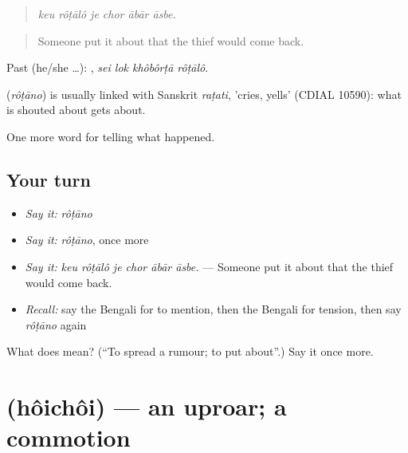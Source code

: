 \begin{quote}
     
\end{quote}

\begin{quote}
\emph{keu rôṭālô je chor ābār āsbe.}
\end{quote}

\begin{quote}
Someone put it about that the thief would come back.
\end{quote}

Past (he/she …):    , \emph{sei lok khôbôrṭā rôṭālô}.

\begin{cousinweb}
\textbf{} (\emph{rôṭāno}) is usually linked with Sanskrit \emph{raṭati}, 'cries, yells' (CDIAL 10590): what is shouted about gets about.
\end{cousinweb}

\begin{grammarlens}[title={What you've built}]
One more word for telling what happened.
\end{grammarlens}

\subsection*{Your turn}
\begin{itemize}
\raggedright
  \item \emph{Say it:} \emph{rôṭāno}
  \item \emph{Say it:} \emph{rôṭāno}, once more
  \item \emph{Say it:} \emph{keu rôṭālô je chor ābār āsbe.} — Someone put it about that the thief would come back.
  \item \emph{Recall:} say the Bengali for to mention, then the Bengali for tension, then say \emph{rôṭāno} again
\end{itemize}

\begin{tcolorbox}[breakable,colback=teal!4,colframe=teal!35!black,title={Before you move on}]
What does  mean? (\textquotedblleft{}To spread a rumour; to put about\textquotedblright{}.) Say it once more.
\end{tcolorbox}
\section[\texorpdfstring{\bn{হইচই} (hôichôi)}{হইচই (hôichôi)}]{ (hôichôi) — an uproar; a commotion}

